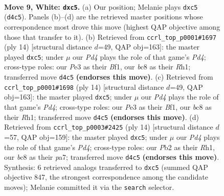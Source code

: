 \documentclass[11pt]{article}
\begin{document}
\clearpage

\begin{figure}[p]\centering
\begin{subfigure}{0.46\textwidth}\centering
\resizebox{\linewidth}{!}{%
\newchessgame
\chessboard[
  setfen={rnbq1rk1/pp2bp2/4pn1p/2pp2p1/2PP4/2N1PNB1/PP3PPP/R2QKB1R w KQ - 0 9},
  showmover=false,
  pgfstyle=straightmove, color=movearrow, markmove={d4-c5}
]}
\caption{}
\end{subfigure}\hfill
\begin{subfigure}{0.46\textwidth}\centering
\resizebox{\linewidth}{!}{%
\newchessgame
\chessboard[
  setfen={rnbqk2r/1p2bpp1/p3pn1p/2pp4/2PP1B2/2N1PN2/PP3PPP/R2QKB1R w KQkq - 0 8},
  showmover=false,
  pgfstyle=straightmove, color=movearrow, markmove={d4-c5}
]}
\caption{}
\end{subfigure}
\\[4pt]
\begin{subfigure}{0.46\textwidth}\centering
\resizebox{\linewidth}{!}{%
\newchessgame
\chessboard[
  setfen={rnbqk2r/1p2bpp1/p3pn1p/2pp4/2PP1B2/2N1PN2/PP3PPP/R2QKB1R w KQkq - 0 8},
  showmover=false,
  pgfstyle=straightmove, color=movearrow, markmove={d4-c5}
]}
\caption{}
\end{subfigure}\hfill
\begin{subfigure}{0.46\textwidth}\centering
\resizebox{\linewidth}{!}{%
\newchessgame
\chessboard[
  setfen={rnbq1rk1/p3bppp/1p2pn2/2pp4/2PP1B2/P1N1PN2/1P3PPP/R2QKB1R w KQ - 0 8},
  showmover=false,
  pgfstyle=straightmove, color=movearrow, markmove={d4-c5}
]}
\caption{}
\end{subfigure}
\caption{\textbf{Move 9, White: \texttt{dxc5}.} (a) Our position; Melanie plays \texttt{dxc5} (\texttt{d4c5}). Panels (b)--(d) are the retrieved master positions whose correspondence most drove this move (highest QAP objective among those that transfer to it). (b) Retrieved from \texttt{ccrl\_top\_p0001\#1697} (ply 14) [structural distance $d$=49, QAP obj=163]: the master played \texttt{dxc5}; under $\mu$ our \emph{Pd4} plays the role of that game's \emph{Pd4}; cross-type roles: our \emph{P}e3 as their \emph{B}f1, our \emph{b}c8 as their \emph{R}h1; transferred move \texttt{d4c5} \textbf{(endorses this move)}. (c) Retrieved from \texttt{ccrl\_top\_p0001\#1698} (ply 14) [structural distance $d$=49, QAP obj=163]: the master played \texttt{dxc5}; under $\mu$ our \emph{Pd4} plays the role of that game's \emph{Pd4}; cross-type roles: our \emph{P}e3 as their \emph{B}f1, our \emph{b}c8 as their \emph{R}h1; transferred move \texttt{d4c5} \textbf{(endorses this move)}. (d) Retrieved from \texttt{ccrl\_top\_p0003\#2425} (ply 14) [structural distance $d$=57, QAP obj=159]: the master played \texttt{dxc5}; under $\mu$ our \emph{Pd4} plays the role of that game's \emph{Pd4}; cross-type roles: our \emph{P}b2 as their \emph{R}h1, our \emph{b}c8 as their \emph{p}a7; transferred move \texttt{d4c5} \textbf{(endorses this move)}. Synthesis: 6 retrieved analogs transferred to \texttt{dxc5} (summed QAP objective 847, the strongest correspondence among the candidate moves); Melanie committed it via the \texttt{search} selector.}
\label{fig:thought-m16}
\end{figure}
\end{document}
